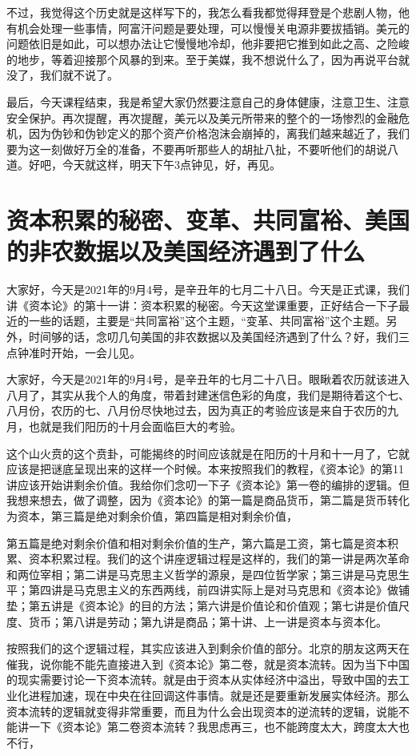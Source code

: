 \documentclass[UTF8, 12pt, a4paper]{ctexrep}
\begin{document}
不过，我觉得这个历史就是这样写下的，我怎么看我都觉得拜登是个悲剧人物，他有机会处理一些事情，阿富汗问题是要处理，可以慢慢关电源非要拔插销。美元的问题依旧是如此，可以想办法让它慢慢地冷却，他非要把它推到如此之高、之险峻的地步，等着迎接那个风暴的到来。至于美媒，我不想说什么了，因为再说平台就没了，我们就不说了。

最后，今天课程结束，我是希望大家仍然要注意自己的身体健康，注意卫生、注意安全保护。再次提醒，再次提醒，美元以及美元所带来的整个的一场惨烈的金融危机，因为伪钞和伪钞定义的那个资产价格泡沫会崩掉的，离我们越来越近了，我们要为这一刻做好万全的准备，不要再听那些人的胡扯八扯，不要听他们的胡说八道。好吧，今天就这样，明天下午3点钟见，好，再见。

\section{资本积累的秘密、变革、共同富裕、美国的非农数据以及美国经济遇到了什么}

大家好，今天是2021年的9月4号，是辛丑年的七月二十八日。今天是正式课，我们讲《资本论》的第十一讲：资本积累的秘密。今天这堂课重要，正好结合一下子最近的一些的话题，主要是“共同富裕”这个主题，“变革、共同富裕”这个主题。另外，时间够的话，念叨几句美国的非农数据以及美国经济遇到了什么？好，我们三点钟准时开始，一会儿见。

大家好，今天是2021年的9月4号，是辛丑年的七月二十八日。眼瞅着农历就该进入八月了，其实从我个人的角度，带着封建迷信色彩的角度，我们是期待着这个七、八月份，农历的七、八月份尽快地过去，因为真正的考验应该是来自于农历的九月，也就是我们阳历的十月会面临巨大的考验。

这个山火贲的这个贲卦，可能揭终的时间应该就是在阳历的十月和十一月了，它就应该是把谜底呈现出来的这样一个时候。本来按照我们的教程，《资本论》的第11讲应该开始讲剩余价值。我给你们念叨一下子《资本论》第一卷的编排的逻辑。但我想来想去，做了调整，因为《资本论》的第一篇是商品货币，第二篇是货币转化为资本，第三篇是绝对剩余价值，第四篇是相对剩余价值，

第五篇是绝对剩余价值和相对剩余价值的生产，第六篇是工资，第七篇是资本积累、资本积累过程。我们的这个讲座逻辑过程是这样的，我们的第一讲是两次革命和两位宰相；第二讲是马克思主义哲学的源泉，是四位哲学家；第三讲是马克思生平；第四讲是马克思主义的东西两线，前四讲实际上是对马克思和《资本论》做铺垫；第五讲是《资本论》的目的方法；第六讲是价值论和价值观；第七讲是价值尺度、货币；第八讲是劳动；第九讲是商品；第十讲、上一讲是资本与资本化。

按照我们的这个逻辑过程，其实应该进入到剩余价值的部分。北京的朋友这两天在催我，说你能不能先直接进入到《资本论》第二卷，就是资本流转。因为当下中国的现实需要讨论一下资本流转。就是由于资本从实体经济中溢出，导致中国的去工业化进程加速，现在中央在往回调这件事情。就是还是要重新发展实体经济。那么资本流转的逻辑就变得非常重要，而且为什么会出现资本的逆流转的逻辑，说能不能讲一下《资本论》第二卷资本流转？我思虑再三，也不能跨度太大，跨度太大也不行，
\end{document}
